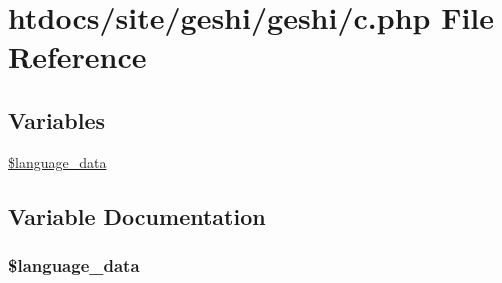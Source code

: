 \hypertarget{c_8php}{\section{htdocs/site/geshi/geshi/c.php File Reference}
\label{c_8php}
}
\subsection*{Variables}
\begin{DoxyCompactItemize}
\item 
\hyperlink{c_8php_a3f855a7e0ebc0899119af33dbb70d890}{\$language\-\_\-data}
\end{DoxyCompactItemize}


\subsection{Variable Documentation}
\hypertarget{c_8php_a3f855a7e0ebc0899119af33dbb70d890}{
\subsubsection[{\$language\-\_\-data}]{\setlength{\rightskip}{0pt plus 5cm}\$language\-\_\-data}}\label{c_8php_a3f855a7e0ebc0899119af33dbb70d890}
